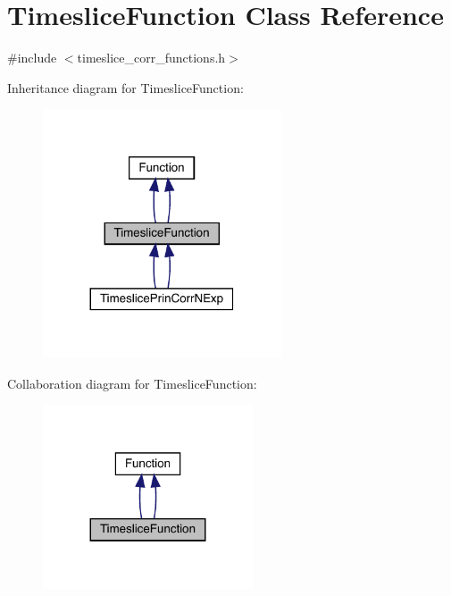 \hypertarget{classTimesliceFunction}{}\section{Timeslice\+Function Class Reference}
\label{classTimesliceFunction}


{\ttfamily \#include $<$timeslice\+\_\+corr\+\_\+functions.\+h$>$}



Inheritance diagram for Timeslice\+Function\+:
\nopagebreak
\begin{figure}[H]
\begin{center}
\leavevmode
\includegraphics[width=200pt]{dd/deb/classTimesliceFunction__inherit__graph}
\end{center}
\end{figure}


Collaboration diagram for Timeslice\+Function\+:
\nopagebreak
\begin{figure}[H]
\begin{center}
\leavevmode
\includegraphics[width=176pt]{dd/dcc/classTimesliceFunction__coll__graph}
\end{center}
\end{figure}

